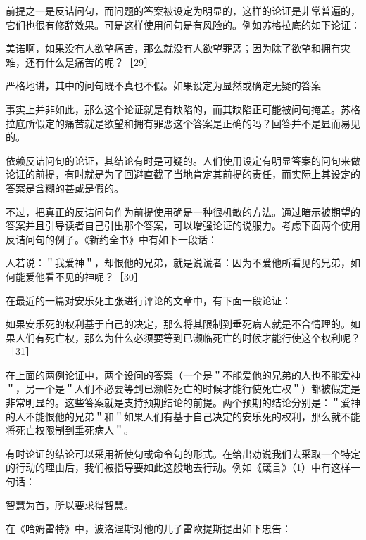 前提之一是反诘问句，而问题的答案被设定为明显的，这样的论证是非常普遍的，它们也很有修辞效果。可是这样使用问句是有风险的。例如苏格拉底的如下论证：

美诺啊，如果没有人欲望痛苦，那么就没有人欲望罪恶；因为除了欲望和拥有灾难，还有什么是痛苦的呢？［29］

严格地讲，其中的问句既不真也不假。如果设定为显然或确定无疑的答案

事实上并非如此，那么这个论证就是有缺陷的，而其缺陷正可能被问句掩盖。苏格拉底所假定的痛苦就是欲望和拥有罪恶这个答案是正确的吗？回答并不是显而易见的。

依赖反诘问句的论证，其结论有时是可疑的。人们使用设定有明显答案的问句来做论证的前提，有时就是为了回避直截了当地肯定其前提的责任，而实际上其设定的答案是含糊的甚或是假的。

不过，把真正的反诘问句作为前提使用确是一种很机敏的方法。通过暗示被期望的答案并且引导读者自己引出那个答案，可以增强论证的说服力。考虑下面两个使用反诘问句的例子。《新约全书》中有如下一段话：

\begin{displayquote}
人若说：＂我爱神＂，却恨他的兄弟，就是说谎者：因为不爱他所看见的兄弟，如何能爱他看不见的神呢？［30］
\end{displayquote}

在最近的一篇对安乐死主张进行评论的文章中，有下面一段论证：

\begin{displayquote}
如果安乐死的权利基于自己的决定，那么将其限制到垂死病人就是不合情理的。如果人们有死亡权，那么为什么必须要等到已濒临死亡的时候才能行使这个权利呢？［31］
\end{displayquote}

在上面的两例论证中，两个设问的答案（一个是＂不能爱他的兄弟的人也不能爱神＂，另一个是＂人们不必要等到已濒临死亡的时候才能行使死亡权＂）都被假定是非常明显的。这些答案就是支持预期结论的前提。两个预期的结论分别是：＂爱神的人不能恨他的兄弟＂和＂如果人们有基于自己决定的安乐死的权利，那么就不能将死亡权限制到垂死病人＂。

有时论证的结论可以采用祈使句或命令句的形式。在给出劝说我们去采取一个特定的行动的理由后，我们被指导要如此这般地去行动。例如《箴言》（1）中有这样一句话：

\begin{displayquote}
智慧为首，所以要求得智慧。
\end{displayquote}

在《哈姆雷特》中，波洛涅斯对他的儿子雷欧提斯提出如下忠告：

